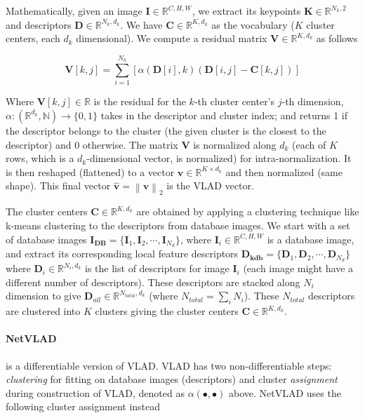 Mathematically, given an image $\mathbf{I} \in \mathbb{R}^{C, H, W}$,
we extract its keypoints $\mathbf{K} \in \mathbb{R}^{N_k, 2}$ and
descriptors $\mathbf{D} \in \mathbb{R}^{N_k, d_k}$. We have
$\mathbf{C} \in \mathbb{R}^{K, d_k}$ as the vocabulary ($K$ cluster
centers, each $d_k$ dimensional). We compute a residual matrix
$\mathbf{V} \in \mathbb{R}^{K, d_k}$ as follows

\begin{equation}
    \mathbf{V}[k, j] = \sum_{i=1}^{N_k} \left[ \alpha \left (
            \mathbf{D}[i], k \right ) \left ( 
                \mathbf{D}[i, j] - \mathbf{C}[k, j] \right ) \right]
\end{equation}

Where $\mathbf{V}[k, j] \in \mathbb{R}$ is the residual for the $k$-th
cluster center's $j$-th dimension, $\alpha:(\mathbb{R}^{d_k},
\mathbb{N}) \rightarrow \{0, 1\}$ takes in the descriptor and cluster
index; and returns 1 if the descriptor belongs to the cluster (the
given cluster is the closest to the descriptor) and 0 otherwise. The
matrix $\mathbf{V}$ is normalized along $d_k$ (each of $K$ rows, which
is a $d_k$-dimensional vector, is normalized) for intra-normalization.
It is then reshaped (flattened) to a vector $\mathbf{v} \in
\mathbb{R}^{K \times d_k}$ and then normalized (same shape). This
final vector $\mathbf{\hat{v}} = \left\| \mathbf{v} \right\|_2$ is the
VLAD vector.

The cluster centers $\mathbf{C} \in \mathbb{R}^{K, d_k}$ are obtained
by applying a clustering technique like k-means clustering to the
descriptors from database images. We start with a set of database
images $\mathbf{I}_\textbf{DB} = \{\mathbf{I}_1, \mathbf{I}_2, \cdots,
\mathbf{I}_{N_d}\}$, where $\mathbf{I}_i \in \mathbb{R}^{C, H, W}$ is
a database image, and extract its corresponding local feature
descriptors $\mathbf{D}_{\textbf{kdb}} = \{\mathbf{D}_1, \mathbf{D}_2,
\cdots, \mathbf{D}_{N_d} \}$ where $\mathbf{D}_i \in \mathbb{R}^{N_i,
d_k}$ is the list of descriptors for image $\mathbf{I}_i$ (each image
might have a different number of descriptors). These descriptors are
stacked along $N_i$ dimension to give $\mathbf{D}_{all} \in
\mathbb{R}^{N_{total}, d_k}$ (where $N_{total} = \sum_i N_i$). These
$N_{total}$ descriptors are clustered into $K$ clusters giving the
cluster centers $\mathbf{C} \in \mathbb{R}^{K, d_k}$.

\paragraph{NetVLAD \cite{Arandjelovi2015NetVLADCA}} is a
differentiable version of VLAD. VLAD has two non-differentiable steps:
\emph{clustering} for fitting on database images (descriptors) and
cluster \emph{assignment} during construction of VLAD, denoted as
$\alpha(\bullet, \bullet)$ above. NetVLAD uses the following cluster
assignment instead

